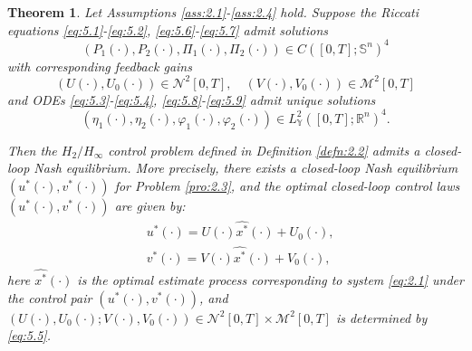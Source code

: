 \documentclass[lettersize,journal]{IEEEtran}
\theoremstyle{plain}
\newtheorem{thm}{Theorem}
\theoremstyle{definition}
\begin{document}
\begin{thm}\label{thm:5.3}
	Let Assumptions \ref{ass:2.1}-\ref{ass:2.4} hold. Suppose the Riccati equations \eqref{eq:5.1}-\eqref{eq:5.2}, \eqref{eq:5.6}-\eqref{eq:5.7} admit solutions 
	\[
	(P_1(\cdot), P_2(\cdot), \Pi_1(\cdot), \Pi_2(\cdot)) \in C([0,T];\mathbb{S}^n)^4
	\]
	with corresponding feedback gains
	\[
	(U(\cdot),U_0(\cdot)) \in \mathcal{N}^2[0,T], \quad (V(\cdot),V_0(\cdot)) \in \mathcal{M}^2[0,T]
	\]
	and ODEs \eqref{eq:5.3}-\eqref{eq:5.4}, \eqref{eq:5.8}-\eqref{eq:5.9} admit unique solutions 
	\[
	(\eta_1(\cdot), \eta_2(\cdot), \varphi_1(\cdot), \varphi_2(\cdot)) \in L_{\mathbb{Y}}^2([0,T];\mathbb{R}^n)^4.
	\]
	
	Then the $H_2/H_\infty$ control problem defined in Definition \ref{defn:2.2} admits a closed-loop Nash equilibrium. More precisely, there exists a closed-loop Nash equilibrium $(u^*(\cdot),v^*(\cdot))$ for Problem \ref{pro:2.3}, and the optimal closed-loop control laws $(u^*(\cdot),v^*(\cdot))$ are given by:
	\begin{equation*}
		\begin{aligned}
			&u^*(\cdot) = U(\cdot)\widehat{x^*}(\cdot) + U_0(\cdot),\\
			&v^*(\cdot) = V(\cdot)\widehat{x^*}(\cdot) + V_0(\cdot),
		\end{aligned}
	\end{equation*}
	here $\widehat{x^*}(\cdot)$ is the optimal estimate process corresponding to system \eqref{eq:2.1} under the control pair $(u^*(\cdot),v^*(\cdot))$, and $(U(\cdot),U_0(\cdot);V(\cdot),V_0(\cdot)) \in \mathcal{N}^2[0,T] \times \mathcal{M}^2[0,T] $ is determined by \eqref{eq:5.5}.
\end{thm}
\end{document}
